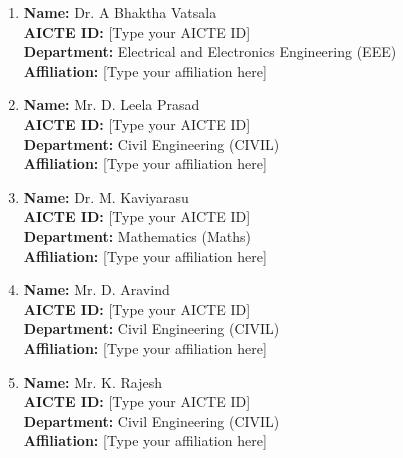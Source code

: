 \documentclass[12pt,a4paper]{report}
\theoremstyle{definition}
\begin{document}
\begin{enumerate}
    \item \textbf{Name:} Dr. A Bhaktha Vatsala \\
    \textbf{AICTE ID:} [Type your AICTE ID] \\
    \textbf{Department:} Electrical and Electronics Engineering (EEE) \\
    \textbf{Affiliation:} [Type your affiliation here] \par
    \vspace{0.4cm}

    \item \textbf{Name:} Mr. D. Leela Prasad \\
    \textbf{AICTE ID:} [Type your AICTE ID] \\
    \textbf{Department:} Civil Engineering (CIVIL) \\
    \textbf{Affiliation:} [Type your affiliation here] \par
    \vspace{0.4cm}

    \item \textbf{Name:} Dr. M. Kaviyarasu \\
    \textbf{AICTE ID:} [Type your AICTE ID] \\
    \textbf{Department:} Mathematics (Maths) \\
    \textbf{Affiliation:} [Type your affiliation here] \par
    \vspace{0.4cm}

    \item \textbf{Name:} Mr. D. Aravind \\
    \textbf{AICTE ID:} [Type your AICTE ID] \\
    \textbf{Department:} Civil Engineering (CIVIL) \\
    \textbf{Affiliation:} [Type your affiliation here] \par
    \vspace{0.4cm}

    \item \textbf{Name:} Mr. K. Rajesh \\
    \textbf{AICTE ID:} [Type your AICTE ID] \\
    \textbf{Department:} Civil Engineering (CIVIL) \\
    \textbf{Affiliation:} [Type your affiliation here] \par
\end{enumerate}
\end{document}
